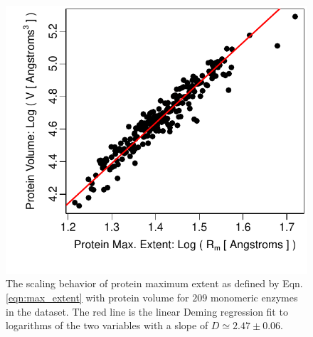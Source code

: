 \documentclass[11pt]{article}
\begin{document}
    \begin{figure}
        \begin{center}
        \includegraphics[width=5.5in]{fractal_dim_max_extent_volume.pdf}
        \end{center}
        \caption{The scaling behavior of protein maximum extent as defined by Eqn. \ref{eqn:max_extent} with protein volume for $209$ monomeric enzymes in the dataset. The red line is the linear Deming regression fit to logarithms of the two variables with a slope of $D\simeq2.47\pm0.06$.}
        \label{fig:maxextent}
    \end{figure}
\end{document}
